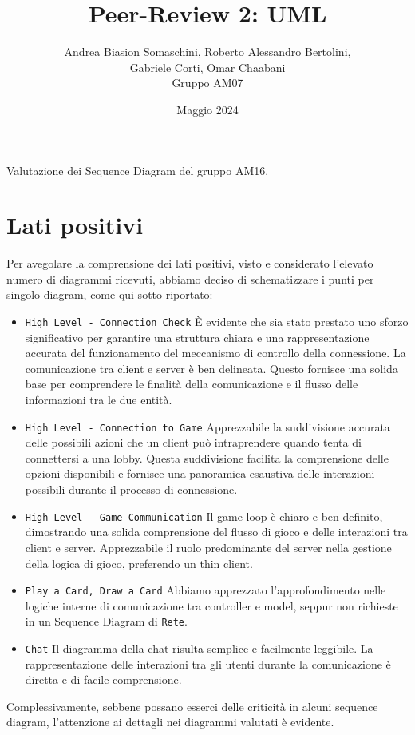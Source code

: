 \documentclass[12pt]{article}
\title{Peer-Review 2: UML}
\author{Andrea Biasion Somaschini, Roberto Alessandro Bertolini,\\ Gabriele Corti, Omar Chaabani\\Gruppo AM07}
\date{Maggio 2024}
\begin{document}
\maketitle

Valutazione dei Sequence Diagram del gruppo AM16.

\newpage

\section{Lati positivi}
Per avegolare la comprensione dei lati positivi, visto e considerato l'elevato numero di diagrammi ricevuti, abbiamo deciso di schematizzare i punti per singolo diagram, come qui sotto riportato:

\begin{itemize}
    \item \texttt{High Level - Connection Check} È evidente che sia stato prestato uno sforzo significativo per garantire una struttura chiara e una rappresentazione accurata del funzionamento del meccanismo di controllo della connessione. La comunicazione tra client e server è ben delineata. Questo fornisce una solida base per comprendere le finalità della comunicazione e il flusso delle informazioni tra le due entità.
    \item \texttt{High Level - Connection to Game} Apprezzabile la suddivisione accurata delle possibili azioni che un client può intraprendere quando tenta di connettersi a una lobby. Questa suddivisione facilita la comprensione delle opzioni disponibili e fornisce una panoramica esaustiva delle interazioni possibili durante il processo di connessione.
    \item \texttt{High Level - Game Communication} Il game loop è chiaro e ben definito, dimostrando una solida comprensione del flusso di gioco e delle interazioni tra client e server. Apprezzabile il ruolo predominante del server nella gestione della logica di gioco, preferendo un thin client.
    \item \texttt{Play a Card, Draw a Card} Abbiamo apprezzato l'approfondimento nelle logiche interne di comunicazione tra controller e model, seppur non richieste in un Sequence Diagram di \texttt{Rete}.
    \item \texttt{Chat} Il diagramma della chat risulta semplice e facilmente leggibile. La rappresentazione delle interazioni tra gli utenti durante la comunicazione è diretta e di facile comprensione.
\end{itemize}
Complessivamente, sebbene possano esserci delle criticità in alcuni sequence diagram, l'attenzione ai dettagli nei diagrammi valutati è evidente.
\end{document}
